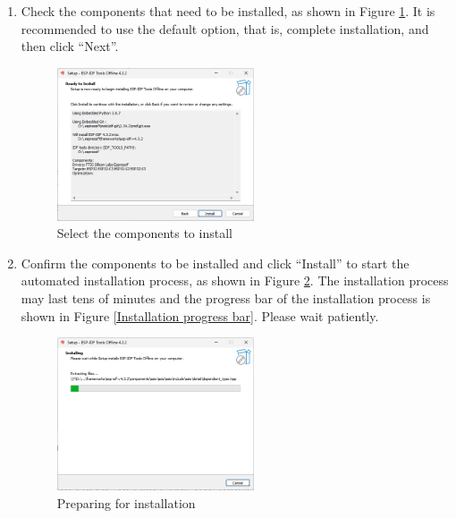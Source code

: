 \documentclass[a4paper,12pt,openany]{book}
\begin{document}
\begin{enumerate}[label=(\arabic*)]
    \item Check the components that need to be installed, as shown in Figure \ref{Select the components to install}. It is recommended to use the default option, that is, complete installation, and then click “Next”.

    \begin{figure}[h!]
        \centering
        \includegraphics[width=0.55\textwidth]{D4Z/4-9}
        \caption{Select the components to install}
        \label{Select the components to install}
    \end{figure}

    \item Confirm the components to be installed and click “Install” to start the automated installation process, as shown in Figure \ref{Preparing for installation}. The installation process may last tens of minutes and the progress bar of the installation process is shown in Figure \ref{Installation progress bar}. Please wait patiently.

    \begin{figure}[h!]
        \centering
        \includegraphics[width=0.55\textwidth]{D4Z/4-10}
        \caption{Preparing for installation}
        \label{Preparing for installation}
    \end{figure}


\end{enumerate}
\end{document}
